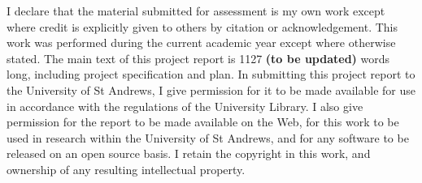 I declare that the material submitted for assessment is my own work except where credit is explicitly given to others by citation or acknowledgement. This work was performed during the current academic year except where otherwise stated. The main text of this project report is 1127 \textbf{(to be updated)} words long, including project specification and plan. In submitting this project report to the University of St Andrews, I give permission for it to be made available for use in accordance with the regulations of the University Library. I also give permission for the report to be made available on the Web, for this work to be used in research within the University of St Andrews, and for any software to be released on an open source basis. I retain the copyright in this work, and ownership of any resulting intellectual property.
